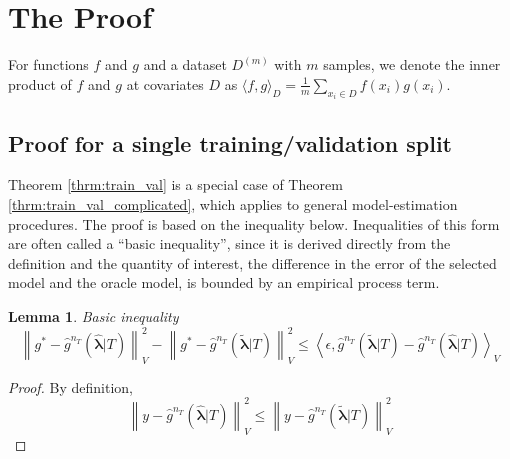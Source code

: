 \documentclass[12pt]{article}
\newtheorem{lemma}{Lemma}
\begin{document}
\section{The Proof} \label{sec:proofs}

For functions $f$ and $g$ and a dataset $D^{(m)}$ with $m$ samples, we denote the inner product of $f$ and $g$ at covariates $D$ as $\langle f,g \rangle_D = \frac{1}{m} \sum_{x_i \in D} f(x_i) g(x_i) $.

\subsection{Proof for a single training/validation split}
\label{appendix:train_val}

Theorem \ref{thrm:train_val} is a special case of Theorem \ref{thrm:train_val_complicated}, which applies to general model-estimation procedures. The proof is based on the inequality below. Inequalities of this form are often called a ``basic inequality'', since it is derived directly from the definition and the quantity of interest, the difference in the error of the selected model and the oracle model, is bounded by an empirical process term.

\begin{lemma}{Basic inequality}
	\begin{equation}
	\label{thrm:basic_ineq}
	\left \| g^* - \hat{g}^{n_T}(\hat{\boldsymbol{\lambda}}|T) \right \|^2_V 
	- \left \| g^* - \hat{g}^{n_T}(\tilde{\boldsymbol{\lambda}}|T) \right \|^2_V
	\le 
	\left \langle \epsilon, \hat{g}^{n_T}(\tilde{\boldsymbol{\lambda}}|T) - \hat{g}^{n_T}(\hat{\boldsymbol{\lambda}}|T) \right \rangle_V
	\end{equation}
\end{lemma}

\begin{proof}
	By definition,
	\begin{equation}
	\left \| y - \hat{g}^{n_T}(\hat{\boldsymbol{\lambda}}|T) \right \|^2_V \le 
	\left \| y - \hat{g}^{n_T}(\tilde{\boldsymbol{\lambda}}|T) \right \|^2_V
	\end{equation}
\end{proof}
\end{document}
